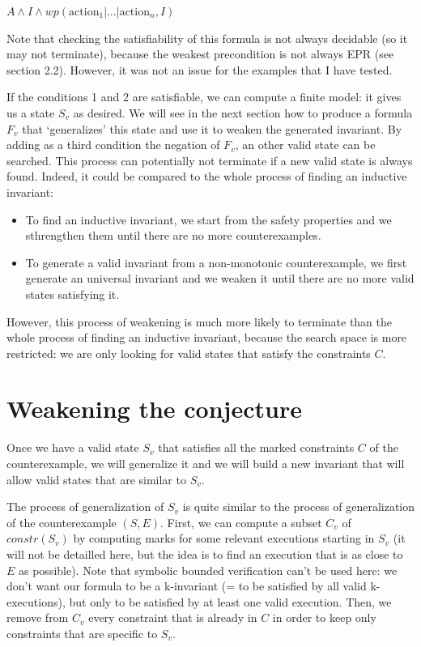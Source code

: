 \documentclass[11pt,a4paper,oldfontcommands,openany]{memoir}
\begin{document}
    \(A \land I \land wp(\text{action}_1|\ldots|\text{action}_n,I)\)

    Note that checking the satisfiability of this formula is not always decidable (so it may not terminate), because the weakest precondition is not always EPR (see section 2.2).
    However, it was not an issue for the examples that I have tested.

    If the conditions 1 and 2 are satisfiable, we can compute a finite model: it gives us a state \(S_v\) as desired.
    We will see in the next section how to produce a formula \(F_v\) that `generalizes' this state and use it to weaken the generated invariant.
    By adding as a third condition the negation of \(F_v\), an other valid state can be searched.
    This process can potentially not terminate if a new valid state is always found. Indeed, it could be compared to the whole process of finding an inductive invariant:
    \begin{itemize}
        \item To find an inductive invariant, we start from the safety properties and we sthrengthen them until there are no more counterexamples.
        \item To generate a valid invariant from a non-monotonic counterexample, we first generate an universal invariant and we weaken it until there are no more valid states satisfying it.
    \end{itemize}
    However, this process of weakening is much more likely to terminate than the whole process of finding an inductive invariant, because the search space is more restricted:
    we are only looking for valid states that satisfy the constraints \(C\).

    \section{Weakening the conjecture}

    Once we have a valid state \(S_v\) that satisfies all the marked constraints \(C\) of the counterexample,
    we will generalize it and we will build a new invariant that will allow valid states that are similar to \(S_v\).

    The process of generalization of \(S_v\) is quite similar to the process of generalization of the counterexample \((S,E)\).
    First, we can compute a subset \(C_v\) of \(constr(S_v)\) by computing marks for some relevant executions starting in \(S_v\)
    (it will not be detailled here, but the idea is to find an execution that is as close to \(E\) as possible).
    Note that symbolic bounded verification can't be used here: we don't want our formula to be a k-invariant (= to be satisfied by all valid k-executions),
    but only to be satisfied by at least one valid execution.
    Then, we remove from \(C_v\) every constraint that is already in \(C\) in order to keep only constraints that are specific to \(S_v\).
\end{document}
